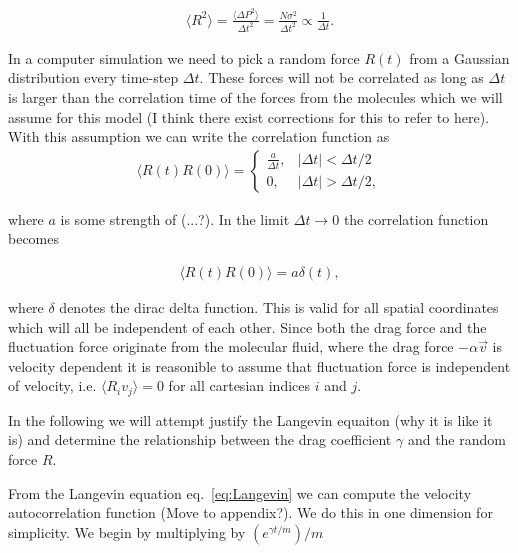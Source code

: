 \begin{align*}
  \langle R^2 \rangle = \frac{\langle \Delta P^2 \rangle}{\Delta t^2} = \frac{N \sigma^2}{\Delta t^2}  \propto \frac{1}{\Delta t}.
\end{align*}

In a computer simulation we need to pick a random force $R(t)$ from a Gaussian distribution every time-step $\Delta t$. These forces will not be correlated as long as $\Delta t$ is larger than the correlation time of the forces from the molecules which we will assume for this model (I think there exist corrections for this to refer to here). With this assumption we can write the correlation function as 
\begin{align}
  \langle R(t) R(0) \rangle = 
  \begin{cases}
    \frac{a}{\Delta t}, & |\Delta t| < \Delta t/2 \\
    0, & |\Delta t| > \Delta t/2,
    \label{eq:disc_corr}
  \end{cases}
\end{align}

where $a$ is some strength of (...?). In the limit $\Delta t \to 0$ the correlation function becomes

\begin{align}
  \langle R(t)R(0) \rangle = a \delta(t),
  \label{eq:F_corr}
\end{align}

where $\delta$ denotes the dirac delta function. This is valid for all spatial coordinates which will all be independent of each other. Since both the drag force and the fluctuation force originate from the molecular fluid, where the drag force $-\alpha \vec{v}$ is velocity dependent it is reasonible to assume that fluctuation force is independent of velocity, i.e. $\langle R_i v_j \rangle = 0$ for all cartesian indices $i$ and $j$.



In the following we will attempt justify the Langevin equaiton (why it is like it is) and determine the relationship between the drag coefficient $\gamma$ and the random force $R$.


From the Langevin equation eq.~\eqref{eq:Langevin} we can compute the velocity autocorrelation function (Move to appendix?). We do this in one dimension for simplicity. We begin by multiplying by $(e^{\gamma t /m})/m$

